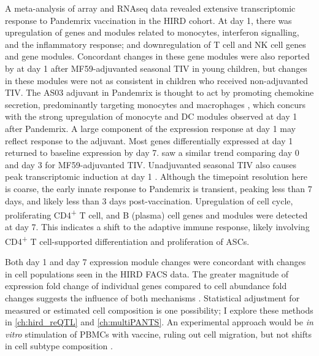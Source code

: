A meta-analysis of array and \gls{RNAseq} data revealed extensive transcriptomic response to Pandemrix vaccination in the \gls{HIRD} cohort.
%
At day 1, there was
upregulation of genes and modules related to monocytes, interferon signalling, and the inflammatory response;
and downregulation of T cell and \gls{NK} cell genes and gene modules.
Concordant changes in these gene modules were also reported by \textcite{nakaya2016SystemsBiologyImmunity} at day 1 after MF59-adjuvanted seasonal \gls{TIV} in young children, but changes in these modules were not as consistent in children who received non-adjuvanted \gls{TIV}.
The AS03 adjuvant in Pandemrix is thought to act by promoting chemokine secretion, predominantly targeting monocytes and macrophages \autocite{morel2011AdjuvantSystemAS03,wilkins2017AS03MF59AdjuvantedInfluenza}, which concurs with the strong upregulation of monocyte and \gls{DC} modules observed at day 1 after Pandemrix.
A large component of the expression response at day 1 may reflect response to the adjuvant.
%
Most genes differentially expressed at day 1 returned to baseline expression by day 7.
\textcite{nakaya2016SystemsBiologyImmunity} saw a similar trend comparing day 0 and day 3 for MF59-adjuvanted \gls{TIV}.
Unadjuvanted seasonal \gls{TIV} also causes peak transcriptomic induction at day 1 \autocite{bucasas2011EarlyPatternsGene}.
Although the timepoint resolution here is coarse,
the early innate response to Pandemrix is transient, peaking less than 7 days, and likely less than 3 days post-vaccination.
%
Upregulation of cell cycle, proliferating CD4\textsuperscript{+} T cell, and B (plasma) cell genes and modules were detected at day 7.
This indicates a shift to the adaptive immune response, likely involving CD4\textsuperscript{+} T cell-supported differentiation and proliferation of \glspl{ASC}.

Both day 1 and day 7 expression module changes were concordant with changes in cell populations seen in the \gls{HIRD} \gls{FACS} data.
The greater magnitude of expression fold change of individual genes compared to cell abundance fold changes suggests the influence of both mechanisms \autocite{sobolev2016AdjuvantedInfluenzaH1N1Vaccination}.
Statistical adjustment for measured or estimated cell composition is one possibility; I explore these methods in \cref{ch:hird_reQTL} and \cref{ch:multiPANTS}.
An experimental approach would be \textit{in vitro} stimulation of \glspl{PBMC} with vaccine, ruling out cell migration, but not shifts in cell subtype composition \autocite{querec2009SystemsBiologyApproach}.

